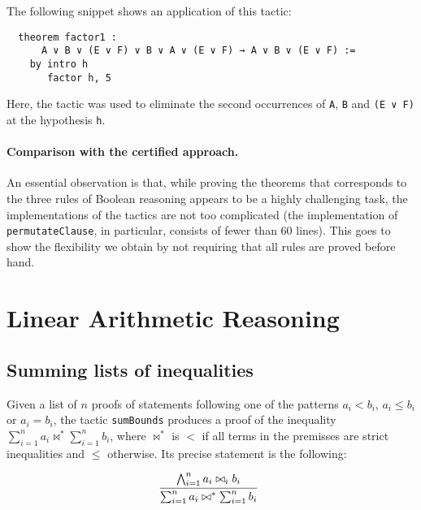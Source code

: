 The following snippet shows an application of this tactic:

\begin{verbatim}
  theorem factor1 :
      A ∨ B ∨ (E ∨ F) ∨ B ∨ A ∨ (E ∨ F) → A ∨ B ∨ (E ∨ F) :=
    by intro h
       factor h, 5
\end{verbatim}

Here, the tactic was used to eliminate the second occurrences of \texttt{A}, \texttt{B} and
\texttt{(E ∨ F)} at the hypothesis \texttt{h}.


\paragraph{Comparison with the certified approach.} An essential observation is that, while proving the theorems that corresponds to the three rules of Boolean reasoning appears to be a highly
challenging task, the implementations of the tactics are not too complicated (the implementation of \texttt{permutateClause},
in particular, consists of fewer than 60 lines). This goes to show the flexibility we obtain by not requiring
that all rules are proved before hand.

\section{Linear Arithmetic Reasoning}

\subsection{Summing lists of inequalities}

Given a list of $n$ proofs of statements following one of the patterns $a_{i} < b_{i}$, $a_{i} \le b_{i}$ or $a_{i} = b_{i}$,
the tactic \texttt{sumBounds}
produces a proof of the inequality $\sum_{i = 1}^{n} a_{i} \bowtie^{*} \sum_{i = 1}^{n} b_{i}$, where $\bowtie^{*}$ is $<$ if
all terms in the premisses are strict inequalities and $\le$ otherwise. Its precise statement is the following:

\[
  \infer[]{\sum_{i = 1}^{n} a_{i} \bowtie^{*} \sum_{i = 1}^{n} b_{i}}{\bigwedge_{i = 1}^{n} a_{i} \bowtie_{i} b_{i}}
\]

